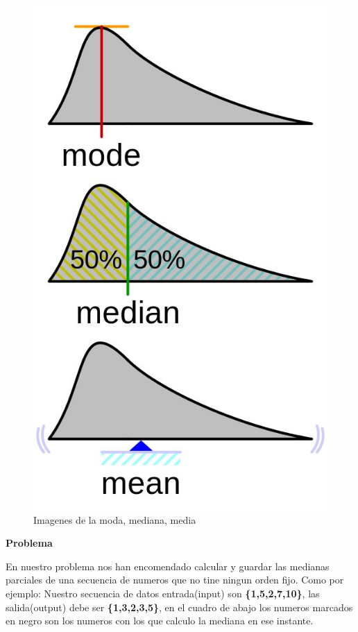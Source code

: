 \begin{figure}[htb]
	\begin{center}
		\includegraphics[scale=0.25]{imagenes/mediana.jpg}
	\end{center}
	\caption{Imagenes de la moda, mediana, media}
\end{figure}

\textbf{Problema} \newline

En nuestro problema nos han encomendado calcular y guardar las medianas parciales de una secuencia de numeros que no tine ningun orden fijo. \newline
Como por ejemplo: Nuestro secuencia de datos entrada(input) son \textbf{\{1,5,2,7,10\}}, las salida(output) debe ser \textbf{\{1,3,2,3,5\}},
en el cuadro de abajo los numeros marcados en negro son los numeros con los que calculo la mediana en ese instante. 

